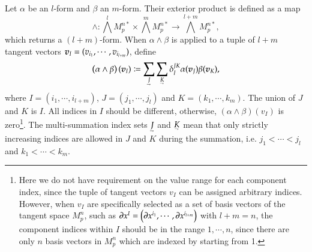 \documentclass[11pt, a4paper]{book}
\begin{document}
\begin{Definition}
  \label{def:exterior-product}
  Let $\alpha$ be an $l$-form and $\beta$ an $m$-form. Their exterior product is defined
  as a map
  \begin{equation}
    \wedge: \bigwedge^l M_p^{n*} \times \bigwedge^m M_p^{n*} \rightarrow
    \bigwedge^{l+m} M_p^{n*},
  \end{equation}
  which returns a $(l+m)$-form. When $\alpha \wedge \beta$ is applied to a tuple of $l+m$
  tangent vectors $\boldsymbol{v}_I = (v_{i_1}, \cdots, v_{i_{l+m}})$, define
  \begin{equation}
    \label{eq:exterior-product-applied-to-vectors}
    \left( \alpha\wedge\beta \right)(\vect{v}_I) \coloneqq
    \sum_{\underaccent{\rightharpoondown}{J}}
    \sum_{\underaccent{\rightharpoondown}{K}} \delta_I^{JK}
    \alpha(\vect{v}_J)\beta(\vect{v}_K),
  \end{equation}
  where $I = (i_1,\cdots,i_{l+m})$, $J = (j_1, \cdots, j_l)$ and $K = (k_1, \cdots, k_m)$.
  The union of $J$ and $K$ is $I$. All indices in $I$ should be different, otherwise,
  $\left( \alpha\wedge\beta \right)(v_I)$ is zero\footnote{Here we do not have requirement
    on the value range for each component index, since the tuple of tangent vectors $v_I$
    can be assigned arbitrary indices. However, when $v_I$ are specifically selected as a
    set of basis vectors of the tangent space $M_p^n$, such as
    $\boldsymbol{\partial}x^I = \left( \boldsymbol{\partial}x^{i_1},\cdots,\boldsymbol{\partial}x^{i_{l+m}}
    \right)$ with $l + m = n$, the component indices within $I$ should be in the range
    $1,\cdots,n$, since there are only $n$ basis vectors in $M_p^n$ which are indexed by
    starting from 1.\label{fn:index-value-range-in-exterior-form}}. The multi-summation
  index sets $\underaccent{\rightharpoondown}{J}$ and $\underaccent{\rightharpoondown}{K}$
  mean that only strictly increasing indices are allowed in $J$ and $K$ during the
  summation, i.e. $j_1 < \cdots < j_{l}$ and $k_1 < \cdots < k_m$.
\end{Definition}
\end{document}
